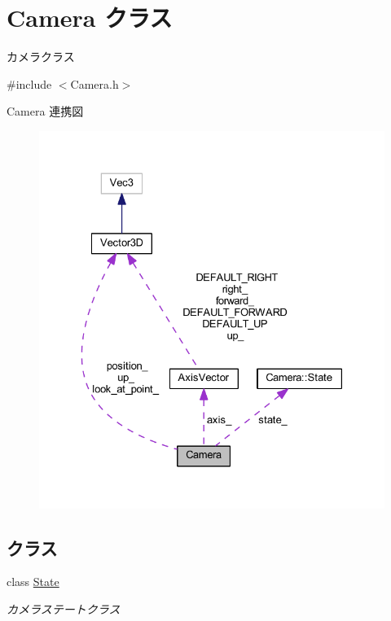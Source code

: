 \hypertarget{class_camera}{}\section{Camera クラス}
\label{class_camera}


カメラクラス  




{\ttfamily \#include $<$Camera.\+h$>$}



Camera 連携図\nopagebreak
\begin{figure}[H]
\begin{center}
\leavevmode
\includegraphics[width=328pt]{class_camera__coll__graph}
\end{center}
\end{figure}
\subsection*{クラス}
\begin{DoxyCompactItemize}
\item 
class \mbox{\hyperlink{class_camera_1_1_state}{State}}
\begin{DoxyCompactList}\small\item\em カメラステートクラス \end{DoxyCompactList}\end{DoxyCompactItemize}
